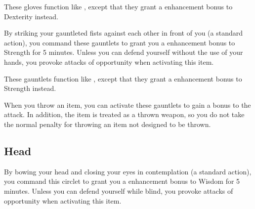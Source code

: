  These gloves function like , except that they grant a  enhancement bonus to Dexterity instead.


 By striking your gauntleted fists against each other in front of you (a standard action), you command these gauntlets to grant you a  enhancement bonus to Strength for 5 minutes. Unless you can defend yourself without the use of your hands, you provoke attacks of opportunity when activating this item.


 These gauntlets function like , except that they grant a  enhancement bonus to Strength instead.


 When you throw an item, you can activate these gauntlets to gain a  bonus to the attack. In addition, the item is treated as a thrown weapon, so you do not take the normal  penalty for throwing an item not designed to be thrown.


\subsection{Head}

 By bowing your head and closing your eyes in contemplation (a standard action), you command this circlet to grant you a  enhancement bonus to Wisdom for 5 minutes. Unless you can defend yourself while blind, you provoke attacks of opportunity when activating this item.



